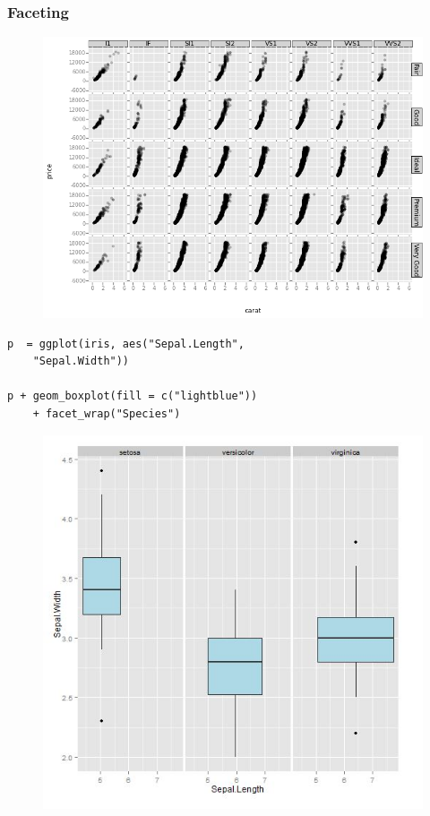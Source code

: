 \documentclass{beamer}
\begin{document}
\begin{frame}
\frametitle{Faceting}
	\begin{figure}
\centering
\includegraphics[width=0.99\linewidth]{Facet4}
\end{figure}

\end{frame}
\begin{frame}[fragile]
	\Large
	\begin{framed}
	\begin{verbatim}
p  = ggplot(iris, aes("Sepal.Length", 
    "Sepal.Width"))
    
p + geom_boxplot(fill = c("lightblue")) 
    + facet_wrap("Species")

	\end{verbatim}
		
	\end{framed}
\end{frame}


\begin{frame}
	\begin{figure}
		\centering
		\includegraphics[width=0.7\linewidth]{iris-boxplot}
	\end{figure}
	
\end{frame}
\end{document}
